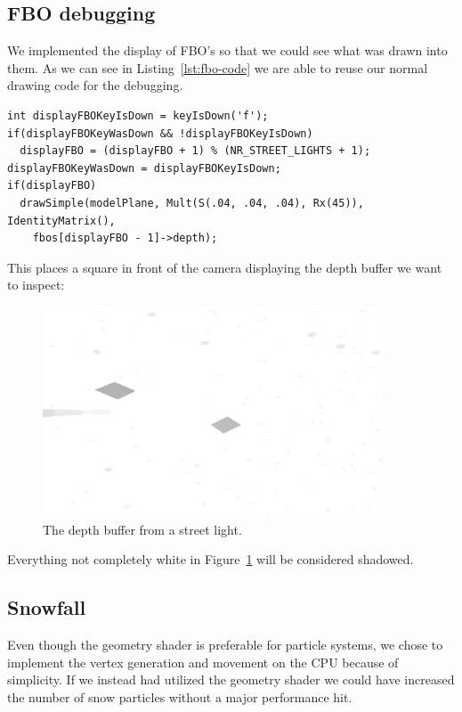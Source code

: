 \documentclass[a4paper,12pt]{article}
\begin{document}
\subsection{FBO debugging}

We implemented the display of FBO's so that we could see what was drawn into them. As we can see in Listing~\ref{lst:fbo-code} we are able to reuse our normal drawing code for the debugging.

\begin{lstlisting}[label=lst:fbo-code,caption= Switching between the FBO's]
int displayFBOKeyIsDown = keyIsDown('f');
if(displayFBOKeyWasDown && !displayFBOKeyIsDown)
  displayFBO = (displayFBO + 1) % (NR_STREET_LIGHTS + 1);
displayFBOKeyWasDown = displayFBOKeyIsDown;
if(displayFBO)
  drawSimple(modelPlane, Mult(S(.04, .04, .04), Rx(45)), IdentityMatrix(),
    fbos[displayFBO - 1]->depth);
\end{lstlisting}

This places a square in front of the camera displaying the depth buffer we want to inspect:

\begin{figure}[ht]
  \centering
  \includegraphics[width=0.9\textwidth]{fbo}
  \caption{\label{fig:fbo-image} The depth buffer from a street light.}
\end{figure}

Everything not completely white in Figure~\ref{fig:fbo-image} will be considered shadowed.

\subsection{Snowfall}
Even though the geometry shader is preferable for particle systems, we chose to implement the vertex generation and movement on the CPU because of simplicity. If we instead had utilized the geometry shader we could have increased the number of snow particles without a major performance hit.
\end{document}
